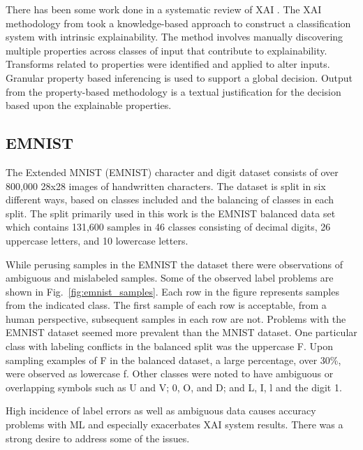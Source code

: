 \documentclass[conference]{IEEEtran}
\begin{document}
There has been some work done in a systematic review of XAI
\cite{vilone2020explainable}.  The XAI methodology from \cite{whitten21} took a
knowledge-based approach to construct a classification system with intrinsic
explainability.  The method involves manually discovering multiple properties
across classes of input that contribute to explainability.  Transforms related
to properties were identified and applied to alter inputs.  Granular property
based inferencing is used to support a global decision.  Output from the
property-based methodology is a textual justification for the decision
based upon the explainable properties.

\subsection{EMNIST}

The Extended MNIST (EMNIST)\cite{cohen2017emnist} character and digit dataset
consists of over 800,000 28x28 images of handwritten characters.  The dataset is
split in six different ways, based on classes included and the balancing of
classes in each split.  The split primarily used in this work is the EMNIST
balanced data set which contains 131,600 samples in 46 classes consisting of
decimal digits, 26 uppercase letters, and 10 lowercase letters.

While perusing samples in the EMNIST the dataset there were observations of
ambiguous and mislabeled samples. Some of the observed label problems are shown
in Fig.~\ref{fig:emnist_samples}. Each row in the figure represents samples from
the indicated class.  The first sample of each row is acceptable, from a human
perspective, subsequent samples in each row are not. Problems with the EMNIST dataset
seemed more prevalent than the MNIST dataset. One particular
class with labeling conflicts in the balanced split was the uppercase F.  Upon
sampling examples of F in the balanced dataset, a large percentage, over 30\%,
were observed as lowercase f. Other classes were noted to have ambiguous or
overlapping symbols such as U and V; $0$, O, and D; and L, I, l and the digit 1.

High incidence of label errors as well as ambiguous data causes accuracy
problems with ML and especially exacerbates XAI system results.  There was a
strong desire to address some of the issues.
\end{document}
